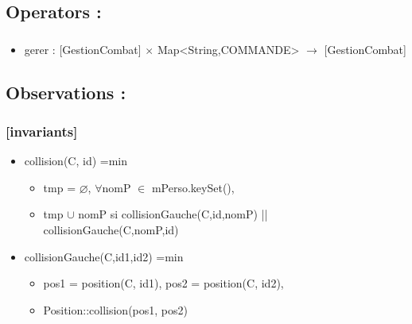\documentclass[11pt]{article}
\begin{document}
\subsection{Operators :}
\label{sec-1.6}

\subsubsection{}

\begin{itemize}

\item gerer : [GestionCombat] $\times$ Map<String,COMMANDE> $\to$ [GestionCombat]\\
\label{sec-1.6.1.1}





\end{itemize} %
\subsection{Observations :}
\label{sec-1.7}

\subsubsection{[invariants]}
\label{sec-1.7.1}

\begin{itemize}

\item collision(C, id) =min\\
\label{sec-1.7.1.1}

\begin{itemize}

\item tmp = $\varnothing$, $\forall$nomP $\in$ mPerso.keySet(),\\
\label{sec-1.7.1.1.1}


\item tmp $\cup$ nomP si collisionGauche(C,id,nomP) || collisionGauche(C,nomP,id)\\
\label{sec-1.7.1.1.2}


\end{itemize} %

\item collisionGauche(C,id1,id2) =min\\
\label{sec-1.7.1.2}

\begin{itemize}

\item pos1 = position(C, id1), pos2 = position(C, id2),\\
\label{sec-1.7.1.2.1}


\item Position::collision(pos1, pos2)\\
\label{sec-1.7.1.2.2}












\end{itemize} %
\end{itemize} %
\end{document}
